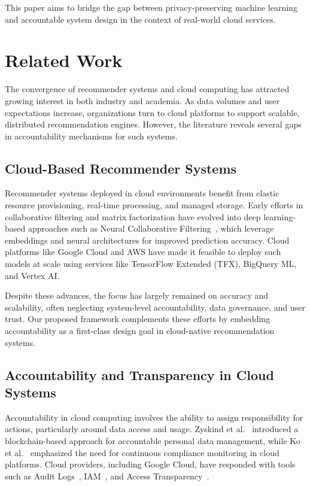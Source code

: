 \documentclass[acmsmall]{acmart}
\begin{document}
This paper aims to bridge the gap between privacy-preserving machine learning and accountable system design in the context of real-world cloud services.

\section{Related Work}

The convergence of recommender systems and cloud computing has attracted growing interest in both industry and academia. As data volumes and user expectations increase, organizations turn to cloud platforms to support scalable, distributed recommendation engines. However, the literature reveals several gaps in accountability mechanisms for such systems.

\subsection{Cloud-Based Recommender Systems}

Recommender systems deployed in cloud environments benefit from elastic resource provisioning, real-time processing, and managed storage. Early efforts in collaborative filtering and matrix factorization have evolved into deep learning-based approaches such as Neural Collaborative Filtering~\cite{he2017neuralcf}, which leverage embeddings and neural architectures for improved prediction accuracy. Cloud platforms like Google Cloud and AWS have made it feasible to deploy such models at scale using services like TensorFlow Extended (TFX), BigQuery ML, and Vertex AI.

Despite these advances, the focus has largely remained on accuracy and scalability, often neglecting system-level accountability, data governance, and user trust. Our proposed framework complements these efforts by embedding accountability as a first-class design goal in cloud-native recommendation systems.

\subsection{Accountability and Transparency in Cloud Systems}

Accountability in cloud computing involves the ability to assign responsibility for actions, particularly around data access and usage. Zyskind et al.~\cite{zyskind2015decentralizing} introduced a blockchain-based approach for accountable personal data management, while Ko et al.~\cite{ko2011cloud} emphasized the need for continuous compliance monitoring in cloud platforms. Cloud providers, including Google Cloud, have responded with tools such as Audit Logs~\cite{gcp_auditlogs}, IAM~\cite{gcp_iam}, and Access Transparency~\cite{gcp_transparency}.
\end{document}
